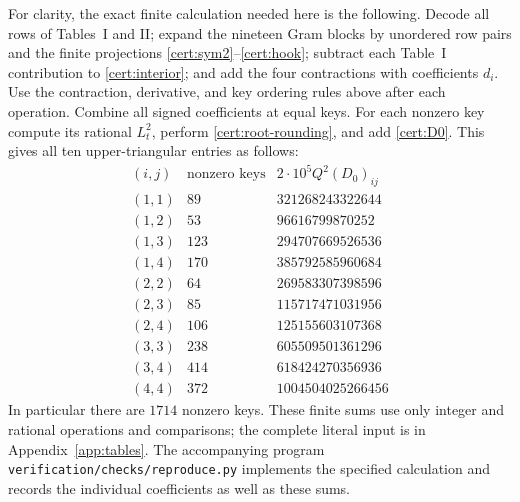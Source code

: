 For clarity, the exact finite calculation needed here is the following.
Decode all rows of Tables~I and II; expand the nineteen Gram blocks by
unordered row pairs and the finite projections
\eqref{cert:sym2}--\eqref{cert:hook}; subtract each Table~I contribution
to \eqref{cert:interior}; and add the four contractions with coefficients
$d_i$.  Use the contraction, derivative, and key ordering rules above after
each operation.  Combine all signed coefficients at equal keys.  For each
nonzero key compute its rational $L_t^2$, perform
\eqref{cert:root-rounding}, and add \eqref{cert:D0}.
This gives all ten upper-triangular entries as follows:
\begin{equation}\label{cert:exact-interior-sums}
\begin{array}{c|r|r}
 (i,j)&\text{nonzero keys}&2\cdot10^5Q^2(D_0)_{ij}\\\hline
 (1,1)&89&321268243322644\\
 (1,2)&53&96616799870252\\
 (1,3)&123&294707669526536\\
 (1,4)&170&385792585960684\\
 (2,2)&64&269583307398596\\
 (2,3)&85&115717471031956\\
 (2,4)&106&125155603107368\\
 (3,3)&238&605509501361296\\
 (3,4)&414&618424270356936\\
 (4,4)&372&1004504025266456
\end{array}
\end{equation}
In particular there are $1714$ nonzero keys.  These finite sums use only
integer and rational operations and comparisons; the complete literal input
is in Appendix~\ref{app:tables}.  The accompanying program
\texttt{verification/checks/reproduce.py} implements the specified calculation and records
the individual coefficients as well as these sums.

